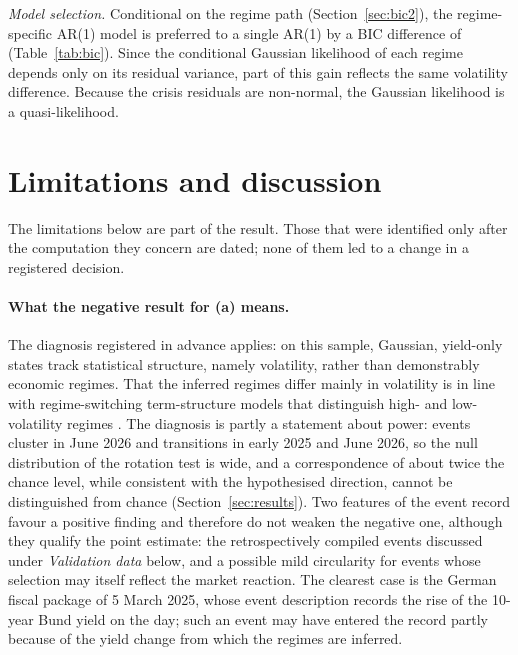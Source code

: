 \documentclass[11pt,a4paper]{article}
\begin{document}
\emph{Model selection.} Conditional on the regime path (Section~\ref{sec:bic2}), the regime-specific AR(1) model is preferred to a single AR(1) by a BIC difference of \DBICtwo{} (Table~\ref{tab:bic}). Since the conditional Gaussian likelihood of each regime depends only on its residual variance, part of this gain reflects the same volatility difference. Because the crisis residuals are non-normal, the Gaussian likelihood is a quasi-likelihood.

\section{Limitations and discussion}\label{sec:limits}

The limitations below are part of the result. Those that were identified only after the computation they concern are dated; none of them led to a change in a registered decision.

\paragraph{What the negative result for (a) means.} The diagnosis registered in advance applies: on this sample, Gaussian, yield-only states track statistical structure, namely volatility, rather than demonstrably economic regimes. That the inferred regimes differ mainly in volatility is in line with regime-switching term-structure models that distinguish high- and low-volatility regimes \citep{dai2006}. The diagnosis is partly a statement about power: events cluster in June 2026 and transitions in early 2025 and June 2026, so the null distribution of the rotation test is wide, and a correspondence of about twice the chance level, while consistent with the hypothesised direction, cannot be distinguished from chance (Section~\ref{sec:results}). Two features of the event record favour a positive finding and therefore do not weaken the negative one, although they qualify the point estimate: the retrospectively compiled events discussed under \emph{Validation data} below, and a possible mild circularity for events whose selection may itself reflect the market reaction. The clearest case is the German fiscal package of 5 March 2025, whose event description records the rise of the 10-year Bund yield on the day; such an event may have entered the record partly because of the yield change from which the regimes are inferred.
\end{document}
